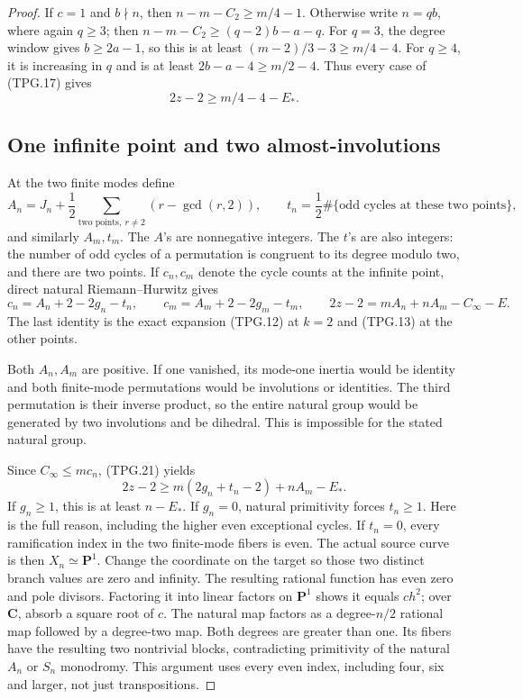 \begin{proof}
If \(c=1\) and \(b\nmid n\), then
\(n-m-C_2\ge m/4-1\).  Otherwise write \(n=qb\),
where again \(q\ge3\); then
\(n-m-C_2\ge(q-2)b-a-q\).
For \(q=3\), the degree window gives \(b\ge2a-1\), so
this is at least \((m-2)/3-3\ge m/4-4\).
For \(q\ge4\), it is increasing in \(q\) and is at least
\(2b-a-4\ge m/2-4\).  Thus every case of (TPG.17) gives
\[
                         2z-2\ge m/4-4-E_*.
 \tag{TPG.19}
\]

\subsection*{One infinite point and two almost-involutions}

At the two finite modes define
\[
 A_n=J_n+\frac12\sum_{\text{two points},\ r\ne2}
                          (r-\gcd(r,2)),\qquad
 t_n=\frac12\#\{\text{odd cycles at these two points}\},
 \tag{TPG.20}
\]
and similarly \(A_m,t_m\).  The \(A\)'s are nonnegative
integers.  The \(t\)'s are also integers: the number of odd
cycles of a permutation is congruent to its degree modulo two,
and there are two points.  If \(c_n,c_m\) denote the cycle
counts at the infinite point, direct natural Riemann--Hurwitz
gives
\[
 c_n=A_n+2-2g_n-t_n,\qquad
 c_m=A_m+2-2g_m-t_m,\qquad
 2z-2=mA_n+nA_m-C_\infty-E.
 \tag{TPG.21}
\]
The last identity is the exact expansion (TPG.12) at \(k=2\)
and (TPG.13) at the other points.

Both \(A_n,A_m\) are positive.  If one vanished, its
mode-one inertia would be identity and both finite-mode
permutations would be involutions or identities.  The third
permutation is their inverse product, so the entire natural
group would be generated by two involutions and be dihedral.
This is impossible for the stated natural group.

Since \(C_\infty\le m c_n\), (TPG.21) yields
\[
          2z-2\ge m(2g_n+t_n-2)+nA_m-E_*.
 \tag{TPG.22}
\]
If \(g_n\ge1\), this is at least \(n-E_*\).
If \(g_n=0\), natural primitivity forces \(t_n\ge1\).
Here is the full reason, including the higher even exceptional
cycles.  If \(t_n=0\), every ramification index in the two
finite-mode fibers is even.  The actual source curve is then
\(X_n\simeq\mathbf P^1\).  Change the coordinate on the
target so those two distinct branch values are zero and infinity.
The resulting rational function has even zero and pole divisors.
Factoring it into linear factors on \(\mathbf P^1\) shows it
equals \(c h^2\); over \(\mathbf C\), absorb a square root
of \(c\).  The natural map factors as a degree-\(n/2\)
rational map followed by a degree-two map.  Both degrees are
greater than one.  Its fibers have the resulting two nontrivial
blocks, contradicting primitivity of the natural \(A_n\) or
\(S_n\) monodromy.  This argument uses every even index,
including four, six and larger, not just transpositions.


\end{proof}
